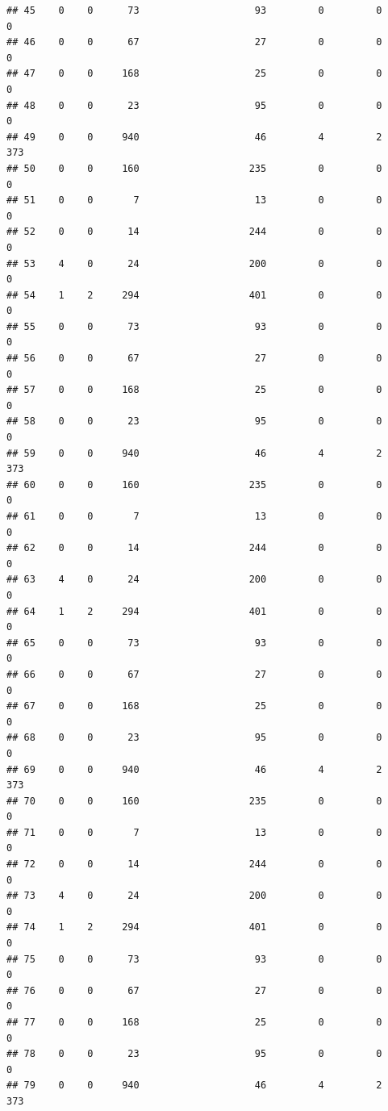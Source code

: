 \documentclass[
]{article}
\begin{document}
\begin{verbatim}
## 45    0    0      73                    93         0         0        0
## 46    0    0      67                    27         0         0        0
## 47    0    0     168                    25         0         0        0
## 48    0    0      23                    95         0         0        0
## 49    0    0     940                    46         4         2      373
## 50    0    0     160                   235         0         0        0
## 51    0    0       7                    13         0         0        0
## 52    0    0      14                   244         0         0        0
## 53    4    0      24                   200         0         0        0
## 54    1    2     294                   401         0         0        0
## 55    0    0      73                    93         0         0        0
## 56    0    0      67                    27         0         0        0
## 57    0    0     168                    25         0         0        0
## 58    0    0      23                    95         0         0        0
## 59    0    0     940                    46         4         2      373
## 60    0    0     160                   235         0         0        0
## 61    0    0       7                    13         0         0        0
## 62    0    0      14                   244         0         0        0
## 63    4    0      24                   200         0         0        0
## 64    1    2     294                   401         0         0        0
## 65    0    0      73                    93         0         0        0
## 66    0    0      67                    27         0         0        0
## 67    0    0     168                    25         0         0        0
## 68    0    0      23                    95         0         0        0
## 69    0    0     940                    46         4         2      373
## 70    0    0     160                   235         0         0        0
## 71    0    0       7                    13         0         0        0
## 72    0    0      14                   244         0         0        0
## 73    4    0      24                   200         0         0        0
## 74    1    2     294                   401         0         0        0
## 75    0    0      73                    93         0         0        0
## 76    0    0      67                    27         0         0        0
## 77    0    0     168                    25         0         0        0
## 78    0    0      23                    95         0         0        0
## 79    0    0     940                    46         4         2      373

\end{verbatim}
\end{document}
